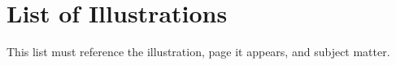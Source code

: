 \documentclass[12pt]{report} %
\begin{document}
    \newpage

    \chapter*{\normalfont List of Illustrations}\label{chapter:ListIllustrations}
    \begin{center}
        This list must reference the illustration, page it appears, and subject matter.
    \end{center}
    
    \newpage

    

    \newpage

    
    
    
    

    \newpage

    
\end{document}

